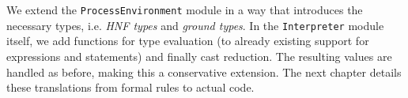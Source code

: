 
We extend the \texttt{ProcessEnvironment} module in a way that introduces the necessary types, i.e. \emph{HNF types} and \emph{ground types}. In the \texttt{Interpreter} module itself, we add functions for type evaluation (to already existing support for expressions and statements) and finally cast reduction. The resulting values are handled as before, making this a conservative extension. The next chapter details these translations from formal rules to actual code.
